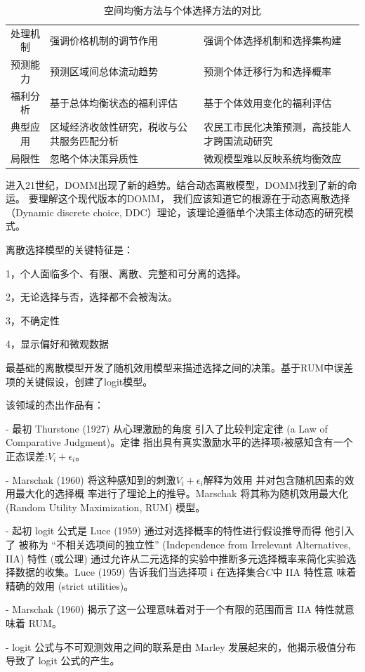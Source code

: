 \documentclass[a4paper,12pt,oneside]{book} %
\begin{document}
\begin{table}[!ht]
\begin{tabularx}{\textwidth}{@{}cXX@{}}
处理机制 & 强调价格机制的调节作用 & 强调个体选择机制和选择集构建 \\
预测能力 & 预测区域间总体流动趋势 & 预测个体迁移行为和选择概率 \\
福利分析 & 基于总体均衡状态的福利评估 & 基于个体效用变化的福利评估 \\
典型应用 & 区域经济收敛性研究，税收与公共服务匹配分析 & 农民工市民化决策预测，高技能人才跨国流动研究 \\
局限性 & 忽略个体决策异质性 & 微观模型难以反映系统均衡效应 \\ 
\bottomrule
\end{tabularx}
\caption{空间均衡方法与个体选择方法的对比}
\label{tab:空间均衡方法与个体选择方法的对比}
\end{table}


进入21世纪，DOMM出现了新的趋势。结合动态离散模型，DOMM找到了新的命运。
要理解这个现代版本的DOMM，
我们应该知道它的根源在于动态离散选择（Dynamic discrete choice, DDC）理论，该理论遵循单个决策主体动态的研究模式。


离散选择模型的关键特征是：

1，个人面临多个、有限、离散、完整和可分离的选择。

2，无论选择与否，选择都不会被淘汰。

3，不确定性

4，显示偏好和微观数据


最基础的离散模型开发了随机效用模型来描述选择之间的决策。基于RUM中误差项的关键假设，创建了logit模型。


该领域的杰出作品有：

- 最初 Thurstone (1927) 从心理激励的角度 引入了比较判定定律 (a Law of Comparative Judgment)。定律 指出具有真实激励水平的选择项$i$被感知含有一个正态误差:$V_i+\epsilon_i$。

- Marschak (1960) 将这种感知到的刺激$V_i+\epsilon_i$解释为效用 并对包含随机因素的效用最大化的选择概 率进行了理论上的推导。Marschak 将其称为随机效用最大化 (Random Utility Maximization, RUM) 模型。

- 起初 logit 公式是 Luce (1959) 通过对选择概率的特性进行假设推导而得 他引入了 被称为 “不相关选项间的独立性” (Independence from Irrelevant Alternatives, IIA) 特性 (或公理) 通过允许从二元选择的实验中推断多元选择概率来简化实验选择数据的收集。Luce (1959) 告诉我们当选择项 i 在选择集合$C$中 IIA 特性意 味着精确的效用 (strict utilities)。

- Marschak (1960) 揭示了这一公理意味着对于一个有限的范围而言 IIA 特性就意味着 RUM。

- logit 公式与不可观测效用之间的联系是由 Marley 发展起来的，他揭示极值分布导致了 logit 公式的产生。
\end{document}
